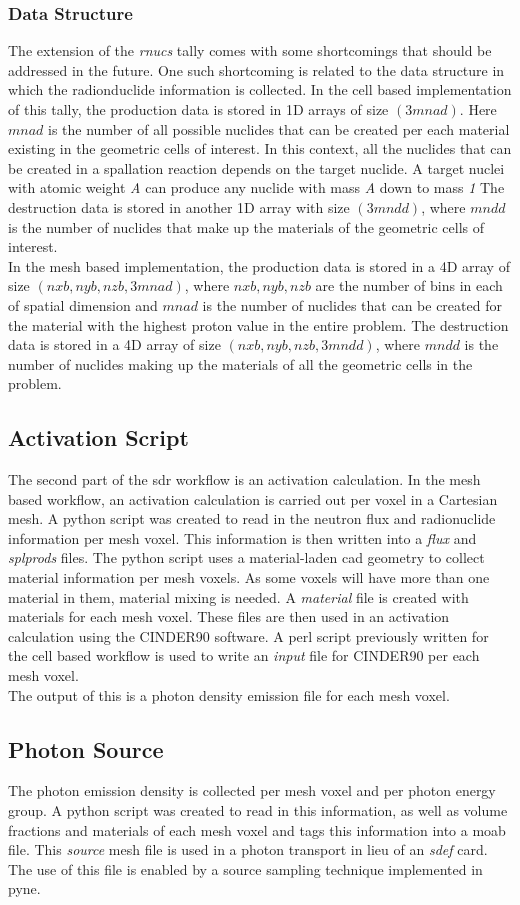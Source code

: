 \subsubsection{Data Structure}
The extension of the \textit{rnucs} tally comes  with some shortcomings that
should be addressed in the future. One such shortcoming is related to the data
structure in which the radionduclide information is collected. In the cell
based implementation of this tally, the production data is stored in 1D arrays
of size $(3mnad)$. Here $mnad$ is the number of all possible nuclides that can
be created per each material existing in the geometric cells of interest. In
this context, all the nuclides that can be created in a spallation reaction
depends on the target nuclide. A target nuclei with atomic weight \emph{A}
can produce any nuclide with mass \emph{A} down to mass \emph{1}
The destruction data is stored in another 1D array with size $(3mndd)$, where
$mndd$ is the number of nuclides that make up the materials of the geometric
cells of interest.\\
In the mesh based implementation, the production data is stored in a 4D array
of size $(nxb,nyb,nzb,3mnad)$, where $nxb, nyb, nzb$ are the number of bins in
each of spatial dimension and $mnad$ is the number of nuclides that can be
created for the material with the highest proton value in the entire problem.
The destruction data is stored in a 4D array of size $(nxb,nyb,nzb,3mndd)$,
where $mndd$ is the number of nuclides making up the materials of all the
geometric cells in the problem.
%
\subsection{Activation Script}
The second part of the \gls{sdr} workflow is an activation calculation. In the
mesh based workflow, an activation calculation is carried out per voxel in a
Cartesian mesh.
A python script was created to read in the neutron flux and radionuclide
information per mesh voxel. This information is then written into a \emph{flux}
and \emph{splprods} files. The python script uses a material-laden
\gls{cad} geometry to collect material information per mesh voxels. As some
voxels will have more than one material in them, material mixing is needed. A
\emph{material} file is created with materials for each mesh voxel.
These files are then used in an activation calculation using the CINDER90
software. A perl script previously written for the cell based workflow is used
to write an \emph{input} file for CINDER90 per each mesh voxel.\\
The output of this is a photon density emission file for each mesh voxel.
\subsection{Photon Source}
The photon emission density is collected per mesh voxel and per photon energy
group. A python script was created to read in this information, as well as
volume fractions and materials of each mesh voxel and tags this information
into a \gls{moab} file.
This \emph{source} mesh file is used in a photon transport in lieu of an
\emph{sdef} card. The use of this file is enabled by a source sampling
technique implemented in \gls{pyne}.
\newpage
